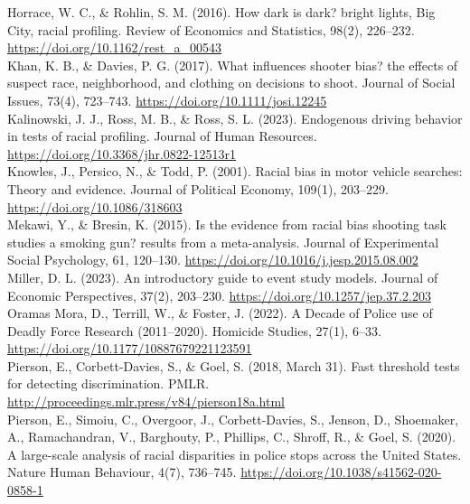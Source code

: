 \documentclass[12pt,a4paper]{article}
\begin{document}
Horrace, W. C., \& Rohlin, S. M. (2016). How dark is dark? bright lights, Big City, racial profiling. Review of Economics and Statistics, 98(2), 226–232. \url{https://doi.org/10.1162/rest\_a\_00543} \\

Khan, K. B., \& Davies, P. G. (2017). What influences shooter bias? the effects of suspect race, neighborhood, and clothing on decisions to shoot. Journal of Social Issues, 73(4), 723–743. \url{https://doi.org/10.1111/josi.12245} \\

Kalinowski, J. J., Ross, M. B., \& Ross, S. L. (2023). Endogenous driving behavior in tests of racial profiling. Journal of Human Resources. \url{https://doi.org/10.3368/jhr.0822-12513r1} \\

Knowles, J., Persico, N., \& Todd, P. (2001). Racial bias in motor vehicle searches: Theory and evidence. Journal of Political Economy, 109(1), 203–229. \url{https://doi.org/10.1086/318603} \\

Mekawi, Y., \& Bresin, K. (2015). Is the evidence from racial bias shooting task studies a smoking gun? results from a meta-analysis. Journal of Experimental Social Psychology, 61, 120–130. \url{https://doi.org/10.1016/j.jesp.2015.08.002} \\

Miller, D. L. (2023). An introductory guide to event study models. Journal of Economic Perspectives, 37(2), 203–230. \url{https://doi.org/10.1257/jep.37.2.203} \\

Oramas Mora, D., Terrill, W., \& Foster, J. (2022). A Decade of Police use of Deadly Force Research (2011–2020). Homicide Studies, 27(1), 6–33. \url{https://doi.org/10.1177/10887679221123591} \\

Pierson, E., Corbett-Davies, S., \& Goel, S. (2018, March 31). Fast threshold tests for detecting discrimination. PMLR. \url{http://proceedings.mlr.press/v84/pierson18a.html} \\

Pierson, E., Simoiu, C., Overgoor, J., Corbett-Davies, S., Jenson, D., Shoemaker, A., Ramachandran, V., Barghouty, P., Phillips, C., Shroff, R., \& Goel, S. (2020). A large-scale analysis of racial disparities in police stops across the United States. Nature Human Behaviour, 4(7), 736–745. \url{https://doi.org/10.1038/s41562-020-0858-1} \\
\end{document}
